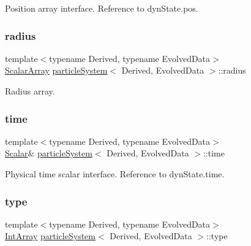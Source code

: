 Position array interface. Reference to dyn\+State.\+pos. 

\mbox{\label{classparticle_system_a8f1ca1c5c748549b9b1fc57cb9bd01a0}} 
\subsubsection{\texorpdfstring{radius}{radius}}
{\footnotesize\ttfamily template$<$typename Derived, typename Evolved\+Data$>$ \\
\mbox{\hyperlink{classparticle_system_af7f328120ff85c8b34edeed4a68b746e}{Scalar\+Array}} \mbox{\hyperlink{classparticle_system}{particle\+System}}$<$ Derived, Evolved\+Data $>$\+::radius}



Radius array. 

\mbox{\label{classparticle_system_a2edb9719905f209d84079450c1a01280}} 
\subsubsection{\texorpdfstring{time}{time}}
{\footnotesize\ttfamily template$<$typename Derived, typename Evolved\+Data$>$ \\
\mbox{\hyperlink{classparticle_system_a28e49da72c0ca5786d0611e6128a8994}{Scalar}}\& \mbox{\hyperlink{classparticle_system}{particle\+System}}$<$ Derived, Evolved\+Data $>$\+::time}



Physical time scalar interface. Reference to dyn\+State.\+time. 

\mbox{\label{classparticle_system_afafaf8f74705b4f569be8d7e4d78aa4f}} 
\subsubsection{\texorpdfstring{type}{type}}
{\footnotesize\ttfamily template$<$typename Derived, typename Evolved\+Data$>$ \\
\mbox{\hyperlink{classparticle_system_aee9dc82f46ce17a477251805094cf19f}{Int\+Array}} \mbox{\hyperlink{classparticle_system}{particle\+System}}$<$ Derived, Evolved\+Data $>$\+::type}



